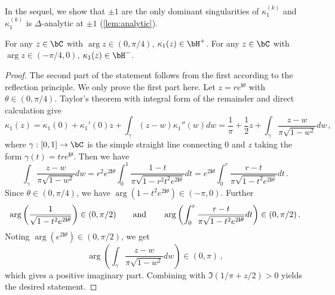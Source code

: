 \documentclass[11pt]{article}
\newcommand{\g}{\kappa_1}
\renewcommand{\i}{\mathbf{i}}
\begin{document}
In the sequel, we show that $\pm 1$ are the only dominant singularities of $\g^{(k)}$ and $\g^{(k)}$ is $\Delta$-analytic at $\pm 1$ (\cref{lem:analytic}). 

\begin{lemma}\label{lem:oct}
For any $z\in \bC$ with $\arg z \in (0,\pi/4)$, $\g(z)\in \bH^+$. For any $z\in \bC$ with $\arg z \in (-\pi/4,0)$, $\g(z)\in \bH^-$.
\end{lemma}
\begin{proof}
The second part of the statement follows from the first according to
the reflection principle. We only prove the first part here. Let $z=r e^{\i\theta}$ with $\theta\in (0,\pi/4)$. Taylor's theorem with integral form of the remainder and direct calculation give \[
\g(z) = \g(0) + \g'(0)z + \int_{\gamma} (z-w)\g''(w)dw = \frac{1}{\pi} + \frac{1}{2}z + \int_{\gamma} \frac{z-w}{\pi\sqrt{1-w^2}}dw\,,
\]
where $\gamma:[0,1]\to\bC$ is the simple straight line connecting $0$ and $z$ taking the form $\gamma(t)=t r e^{\i\theta}$. Then we have \[
\int_{\gamma} \frac{z-w}{\pi\sqrt{1-w^2}}dw = r^2 e^{2\i\theta}\int_0^1 \frac{1-t}{\pi\sqrt{1-r^2t^2 e^{2\i\theta}}} dt = e^{2\i\theta}\int_0^r \frac{r-t}{\pi\sqrt{1-t^2 e^{2\i\theta}}} dt\,.
\]
Since $\theta \in (0,\pi/4)$, we have $\arg(1-t^2 e^{2\i\theta})\in (-\pi,0)$. Further 
\[
\arg\left(\frac{1}{\sqrt{1-t^2 e^{2\i\theta}}}\right)\in (0,\pi/2)\qquad \textnormal{and}\qquad \arg \left(\int_0^r \frac{r-t}{\pi\sqrt{1-t^2 e^{2\i\theta}}} dt\right) \in (0,\pi/2)\,.
\]
Noting $\arg (e^{2\i\theta})\in (0,\pi/2)$, we get
\[\arg \left(\int_{\gamma} \frac{z-w}{\pi\sqrt{1-w^2}}dw\right) \in (0,\pi)\,,\]
which gives a positive imaginary part. Combining with $\Im(1/\pi+z/2) > 0$ yields the desired statement. 
\end{proof}
\end{document}
